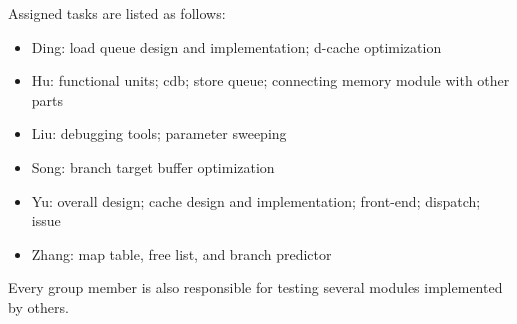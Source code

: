 Assigned tasks are listed as follows:

\begin{itemize}
    \item Ding: load queue design and implementation; d-cache optimization
    \item Hu: functional units; cdb; store queue; connecting memory module with other parts
    \item Liu: debugging tools; parameter sweeping
    \item Song: branch target buffer optimization
    \item Yu: overall design; cache design and implementation; front-end; dispatch; issue
    \item Zhang: map table, free list, and branch predictor
\end{itemize}

Every group member is also responsible for testing several modules implemented by others.